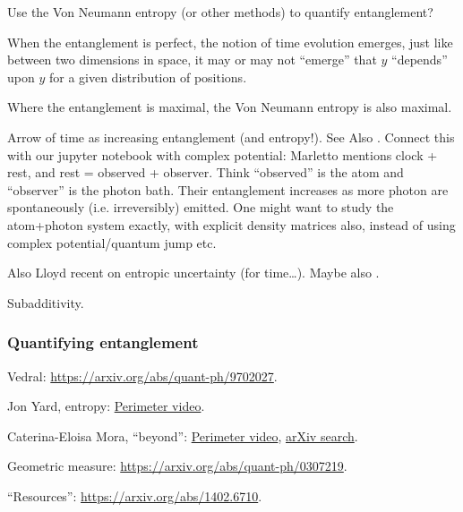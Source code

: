 Use the Von Neumann entropy (or other methods) to quantify entanglement?

When the entanglement is perfect, the notion of time evolution emerges, just
like between two dimensions in space, it may or may not ``emerge'' that
$y$ ``depends'' upon $y$ for a given distribution of positions.

Where the entanglement is maximal, the Von Neumann entropy is also maximal.

Arrow of time as increasing entanglement (and entropy!). See Also
\cite{Marletto:Evolution}.
Connect this with our jupyter notebook with complex potential: Marletto mentions
clock + rest, and rest = observed + observer. Think ``observed'' is the atom
and ``observer'' is the photon bath. Their entanglement increases as
more photon are spontaneously (i.e. irreversibly) emitted.
One might want to study the atom+photon system exactly,
with explicit density matrices also,
instead of using
complex potential/quantum jump etc.

Also Lloyd recent on entropic uncertainty (for time\dots \cite{Lloyd:Entropic}).
Maybe also \cite{Wehner:Uncertainty}.

Subadditivity.

\subsubsection{Quantifying entanglement}

Vedral: \url{https://arxiv.org/abs/quant-ph/9702027}.

Jon Yard, entropy: \href{http://www.perimeterinstitute.ca/fr/videos/quantifying-entanglement-quantum-entropy}{Perimeter video}.

Caterina-Eloisa Mora, ``beyond'':
\href{https://www.perimeterinstitute.ca/videos/quantifying-quantumness-correlations-beyond-entanglement-and-back}{Perimeter video},
\href{https://arxiv.org/search/advanced?advanced=&terms-0-operator=AND&terms-0-term=Mora%2C+caterina-eloisa&terms-0-field=author&terms-1-operator=OR&terms-1-term=mora%2C+c+e&terms-1-field=author&classification-physics_archives=all&classification-include_cross_list=include&date-filter_by=all_dates&date-year=&date-from_date=&date-to_date=&date-date_type=submitted_date&abstracts=show&size=50&order=-announced_date_first}{arXiv search}.

Geometric measure: \url{https://arxiv.org/abs/quant-ph/0307219}.

``Resources'': \url{https://arxiv.org/abs/1402.6710}.

